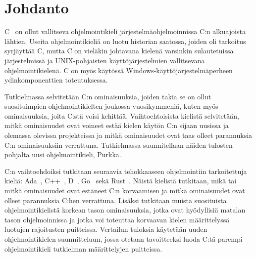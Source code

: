\section{Johdanto}


C~\citep{C18} on ollut vallitseva ohjelmointikieli järjestelmäohjelmoinnissa
C:n alkuajoista lähtien. Useita ohjelmointikieliä on luotu historian saatossa,
joiden oli tarkoitus syrjäyttää C, mutta C on vieläkin johtavana kielenä
varsinkin sulautetuissa järjestelmissä ja UNIX-pohjaisten käyttöjärjestelmien
vallitsevana ohjelmointikielenä. C on myös käytössä
Windows-käyttöjärjestelmäperheen ydinkomponenttien toteutuksessa.

Tutkielmassa selvitetään C:n ominaisuuksia, joiden takia se on ollut
suosituimpien ohjelmointikielten joukossa vuosikymmeniä, kuten myös
ominaisuuksia, joita C:stä voisi kehittää. Vaihtoehtoisista kielistä
selvitetään, mitkä ominaisuudet ovat voineet estää kielen käytön C:n sijaan
uusissa ja olemassa olevissa projekteissa ja mitkä ominaisuudet ovat taas
olleet parannuksia C:n ominaisuuksiin verrattuna. Tutkielmassa suunnitellaan
näiden tulosten pohjalta uusi ohjelmointikieli, Purkka.

C:n vaihtoehdoiksi tutkitaan seuraavia tehokkaaseen ohjelmointiin tarkoitettuja
kieliä: Ada~\citep{ADA12}, C++~\citep{CPP17}, D~\citep{D}, Go~\citep{golang}
sekä Rust~\citep{rust}. Näistä kielistä tutkitaan, mikä tai mitkä ominaisuudet
ovat estäneet C:n korvaamisen ja mitkä ominaisuudet ovat olleet parannuksia
C:hen verrattuna. Lisäksi tutkitaan muista suosituista ohjelmointikielistä
korkean tason ominaisuuksia, jotka ovat hyödyllisiä matalan tason
ohjelmoinnissa ja jotka voi toteuttaa korvaavan kielen määrittelyssä luotujen
rajoitusten puitteissa. Vertailun tuloksia käytetään uuden ohjelmointikielen
suunnitteluun, jossa otetaan tavoitteeksi luoda C:tä parempi ohjelmointikieli
tutkielman määrittelyjen puitteissa.


